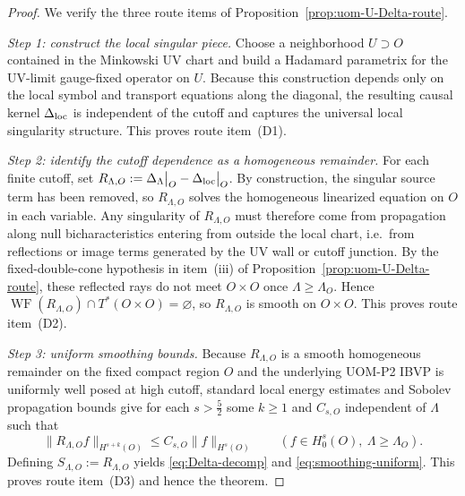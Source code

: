 \documentclass[10pt]{article}
\theoremstyle{definition}
\theoremstyle{plain}
\begin{document}
\begin{proof}
We verify the three route items of Proposition~\ref{prop:uom-U-Delta-route}.

\emph{Step 1: construct the local singular piece.}
Choose a neighborhood $U\supset O$ contained in the Minkowski UV chart and build a Hadamard parametrix for the UV-limit gauge-fixed operator on $U$.
Because this construction depends only on the local symbol and transport equations along the diagonal, the resulting causal kernel $\Delta_{\rm loc}$ is
independent of the cutoff and captures the universal local singularity structure.  This proves route item~\textnormal{(D1)}.

\emph{Step 2: identify the cutoff dependence as a homogeneous remainder.}
For each finite cutoff, set
\(
R_{\Lambda,O}:=\Delta_\Lambda\big|_O-\Delta_{\rm loc}\big|_O
\).
By construction, the singular source term has been removed, so $R_{\Lambda,O}$ solves the homogeneous linearized equation on $O$ in each variable.
Any singularity of $R_{\Lambda,O}$ must therefore come from propagation along null bicharacteristics entering from outside the local chart, i.e.\ from
reflections or image terms generated by the UV wall or cutoff junction.  By the fixed-double-cone hypothesis in item~\textnormal{(iii)} of
Proposition~\ref{prop:uom-U-Delta-route}, these reflected rays do not meet $O\times O$ once $\Lambda\ge\Lambda_O$.  Hence
\(
\operatorname{WF}(R_{\Lambda,O})\cap T^*(O\times O)=\varnothing
\),
so $R_{\Lambda,O}$ is smooth on $O\times O$.  This proves route item~\textnormal{(D2)}.

\emph{Step 3: uniform smoothing bounds.}
Because $R_{\Lambda,O}$ is a smooth homogeneous remainder on the fixed compact region $O$ and the underlying UOM-P2 IBVP is uniformly well posed at high
cutoff, standard local energy estimates and Sobolev propagation bounds give for each $s>\frac52$ some $k\ge 1$ and $C_{s,O}$ independent of $\Lambda$
such that
\[
\|R_{\Lambda,O} f\|_{H^{s+k}(O)}\le C_{s,O}\|f\|_{H^s(O)}
\qquad
(f\in H_0^s(O),\ \Lambda\ge\Lambda_O).
\]
Defining $S_{\Lambda,O}:=R_{\Lambda,O}$ yields \eqref{eq:Delta-decomp} and \eqref{eq:smoothing-uniform}.  This proves route item~\textnormal{(D3)}
and hence the theorem.
\end{proof}
\end{document}
